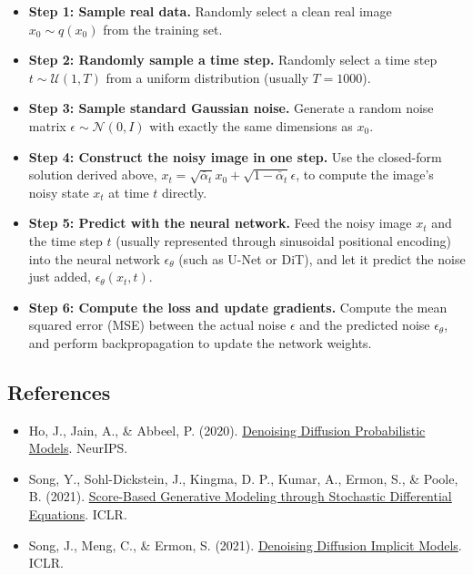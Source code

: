 \begin{itemize}
\tightlist
\item
  \textbf{Step 1: Sample real data.} Randomly select a clean real image \(x_0\sim q(x_0)\) from the training set.
\item
  \textbf{Step 2: Randomly sample a time step.} Randomly select a time step \(t\sim\mathcal{U}(1,T)\) from a uniform distribution (usually \(T=1000\)).
\item
  \textbf{Step 3: Sample standard Gaussian noise.} Generate a random noise matrix \(\epsilon\sim\mathcal{N}(0,I)\) with exactly the same dimensions as \(x_0\).
\item
  \textbf{Step 4: Construct the noisy image in one step.} Use the closed-form solution derived above, \(x_t=\sqrt{\bar{\alpha}_t}x_0+\sqrt{1-\bar{\alpha}_t}\epsilon\), to compute the image's noisy state \(x_t\) at time \(t\) directly.
\item
  \textbf{Step 5: Predict with the neural network.} Feed the noisy image \(x_t\) and the time step \(t\) (usually represented through sinusoidal positional encoding) into the neural network \(\epsilon_\theta\) (such as U-Net or DiT), and let it predict the noise just added, \(\epsilon_\theta(x_t,t)\).
\item
  \textbf{Step 6: Compute the loss and update gradients.} Compute the mean squared error (MSE) between the actual noise \(\epsilon\) and the predicted noise \(\epsilon_\theta\), and perform backpropagation to update the network weights.
\end{itemize}

\FloatBarrier
{}
\hypertarget{references-128}{%
\subsection{References}\label{references-128}}

\vspace{0.25em}
\begin{itemize}
\tightlist
\item
  Ho, J., Jain, A., \& Abbeel, P. (2020). \href{https://arxiv.org/abs/2006.11239}{Denoising Diffusion Probabilistic Models}. NeurIPS.
\item
  Song, Y., Sohl-Dickstein, J., Kingma, D. P., Kumar, A., Ermon, S., \& Poole, B. (2021). \href{https://arxiv.org/abs/2011.13456}{Score-Based Generative Modeling through Stochastic Differential Equations}. ICLR.
\item
  Song, J., Meng, C., \& Ermon, S. (2021). \href{https://arxiv.org/abs/2010.02502}{Denoising Diffusion Implicit Models}. ICLR.
\end{itemize}

\clearpage
